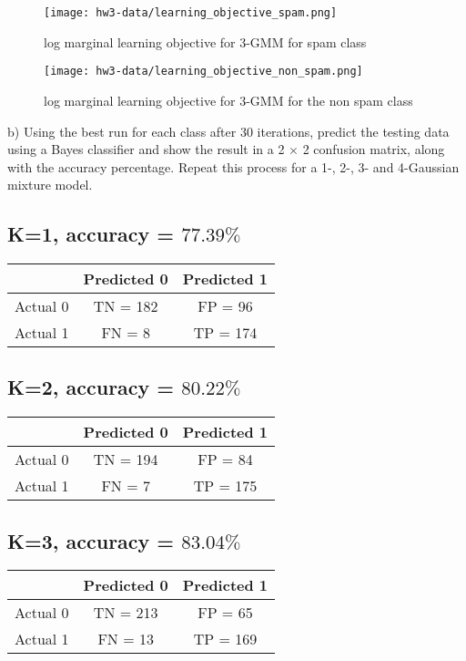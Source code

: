\documentclass[11pt]{report}
\begin{document}
\begin{figure}[hbt!]
\texttt{[image: hw3-data/learning\_objective\_spam.png]}
\centering
\caption{log marginal learning objective for 3-GMM for spam class}
\label{fig:k_means_3_clusters}
\end{figure}
\pagebreak
\begin{figure}[hbt!]
\texttt{[image: hw3-data/learning\_objective\_non\_spam.png]}
\centering
\caption{log marginal learning objective for 3-GMM for the non spam class}
\label{fig:k_means_3_clusters}
\end{figure}
\pagebreak

\justify b) Using the best run for each class after 30 iterations, predict the testing data using a Bayes classifier and show the result in a 2 $\times$ 2 confusion matrix, along with the accuracy percentage. Repeat this process for a 1-, 2-, 3- and 4-Gaussian mixture model.

\subsection * {K=1, accuracy = \textbf{$77.39\%$}}
\begin{center}
\begin{tabular}{ |c|c|c| } 
 \hline
  & Predicted 0  & Predicted 1 \\ 
 \hline
 Actual 0 & TN = 182 & FP = 96 \\ 
  \hline
Actual 1  & FN = 8 &  TP = 174 \\ 
 \hline
\end{tabular}
\end{center}

\subsection * {K=2, accuracy = \textbf{$80.22\%$}}
\begin{center}
\begin{tabular}{ |c|c|c| } 
 \hline
  & Predicted 0  & Predicted 1 \\ 
 \hline
 Actual 0 & TN = 194 & FP = 84 \\ 
  \hline
Actual 1  & FN = 7 &  TP = 175 \\ 
 \hline
\end{tabular}
\end{center}

\subsection * {K=3, accuracy = \textbf{$83.04\%$}}
\begin{center}
\begin{tabular}{ |c|c|c| } 
 \hline
  & Predicted 0  & Predicted 1 \\ 
 \hline
 Actual 0 & TN = 213 & FP = 65 \\ 
  \hline
Actual 1  & FN = 13 &  TP = 169 \\ 
 \hline
\end{tabular}
\end{center}
\end{document}
